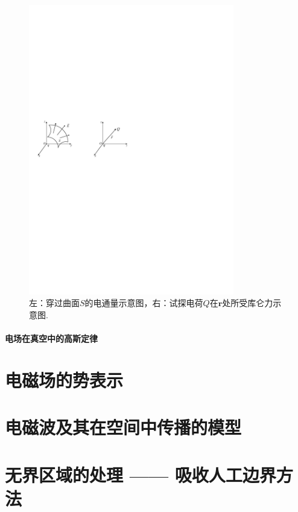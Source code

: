 \documentclass[10pt,reqno, final]{ctexart}
\begin{document}
\begin{figure}[htp]
	\centering
	\includegraphics[width=0.8\textwidth]{Figures/EandCoulumb}
	\caption {左：穿过曲面$S$的电通量示意图，右：试探电荷$Q$在$\bm{r}$处所受库仑力示意图. }
	\label{eandcoulumb}
\end{figure}

\paragraph{电场在真空中的高斯定律}








\section{电磁场的势表示}
\section{电磁波及其在空间中传播的模型}
\section{无界区域的处理 —— 吸收人工边界方法}
\end{document}
